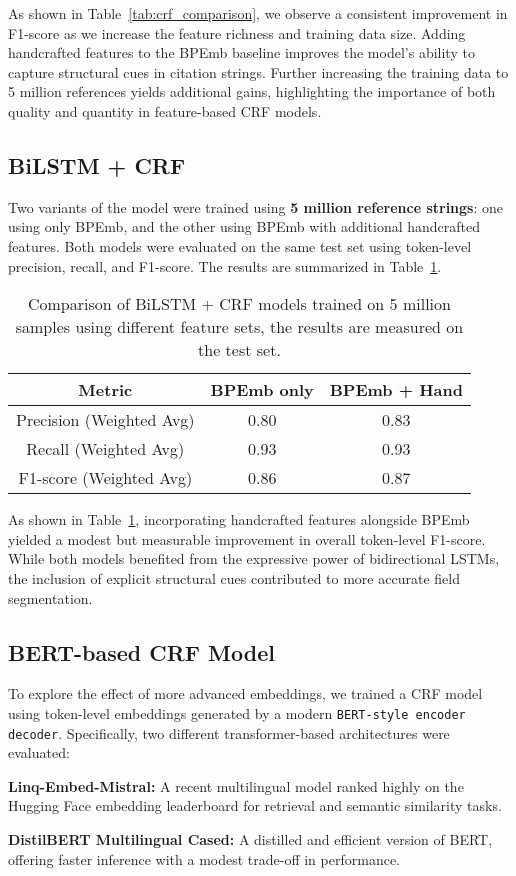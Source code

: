 As shown in Table~\ref{tab:crf_comparison}, we observe a consistent improvement in F1-score as we increase the feature richness and training data size. Adding handcrafted features to the BPEmb baseline improves the model's ability to capture structural cues in citation strings. Further increasing the training data to 5 million references yields additional gains, highlighting the importance of both quality and quantity in feature-based CRF models.


\subsection{BiLSTM + CRF}
Two variants of the model were trained using \textbf{5 million reference strings}: one using only BPEmb, and the other using BPEmb with additional handcrafted features. Both models were evaluated on the same test set using token-level precision, recall, and F1-score. The results are summarized in Table~\ref{tab:bilstm_comparison}.
\begin{table}[h]
    \centering
    \begin{tabular}{|c|c|c|}
        \hline
        \textbf{Metric} & \textbf{BPEmb only} & \textbf{BPEmb + Hand} \\
        \hline
        Precision (Weighted Avg) & 0.80 & 0.83 \\
        Recall (Weighted Avg)    & 0.93 & 0.93 \\
        F1-score (Weighted Avg)  & 0.86 & 0.87 \\
        \hline
    \end{tabular}
    \caption[BiLSTM+CRF Feature Set Comparison]{Comparison of BiLSTM + CRF models trained on 5 million samples using different feature sets, the results are measured on the test set.}
    \label{tab:bilstm_comparison}
\end{table}

As shown in Table~\ref{tab:bilstm_comparison}, incorporating handcrafted features alongside BPEmb yielded a modest but measurable improvement in overall token-level F1-score. While both models benefited from the expressive power of bidirectional LSTMs, the inclusion of explicit structural cues contributed to more accurate field segmentation.

\subsection{BERT-based CRF Model}
To explore the effect of more advanced embeddings, we trained a CRF model using token-level embeddings generated by a modern \texttt{BERT-style encoder\\decoder}. Specifically, two different transformer-based architectures were evaluated:
\begin{compactitem}
\item \textbf{Linq-Embed-Mistral:} A recent multilingual model ranked highly on the Hugging Face embedding leaderboard for retrieval and semantic similarity tasks.
\item \textbf{DistilBERT Multilingual Cased:} A distilled and efficient version of BERT, offering faster inference with a modest trade-off in performance.
\end{compactitem}

